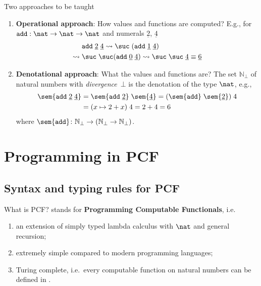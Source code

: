 \begin{frame}{Two approaches to be taught}
  \begin{enumerate}
    \item \textbf{Operational approach}: How values and functions are computed?
      E.g., for $\mathtt{add}:\nat \to \nat \to\nat$ and numerals
      $\underline{2}$, $\underline{4}$
      \begin{align*}
        & \mathtt{add}\;\underline{2}\;\underline{4}
        \leadsto \suc\;(\mathtt{add}\; \underline{1}\;\underline{4}) \\
        \leadsto{} & \suc\;\suc(\mathtt{add}\; \underline{0}\;\underline{4})
        \leadsto \suc\;\suc\;\underline{4} \equiv
        \underline{6}
      \end{align*}
    \item \textbf{Denotational approach}: What the values and functions are?
      The set $\mathbb{N}_\bot$ of natural numbers with
      \emph{divergence}~$\bot$ is the denotation of the type $\nat$, e.g., 
      \begin{align*}
        \sem{\mathtt{add}\;\underline{2}\;\underline{4}} 
        & = \sem{\mathtt{add}\;\underline{2}}\;\sem{\underline{4}} 
        = (\sem{\mathtt{add}}\;\sem{\underline{2}}) \;4  \\
        & = (x \mapsto 2 + x)\;4 
        = 2 + 4 = 6
      \end{align*}
      where $\sem{\mathtt{add}}\colon \mathbb{N}_\bot \to (\mathbb{N}_\bot \to
      \mathbb{N}_\bot)$. 
  \end{enumerate}
\end{frame}

\section{Programming in PCF}

\subsection{Syntax and typing rules for PCF}

\begin{frame}{What is PCF?}
  \PCF{} stands for \textbf{Programming Computable Functionals}, i.e.\ 
  \begin{enumerate}
    \item an extension of simply typed lambda calculus with $\nat$ and
      general recursion; 
    \item extremely simple compared to modern programming languages;
    \item Turing complete, i.e.\ every computable function on natural numbers
      can be defined in \PCF.
  \end{enumerate}
\end{frame}

